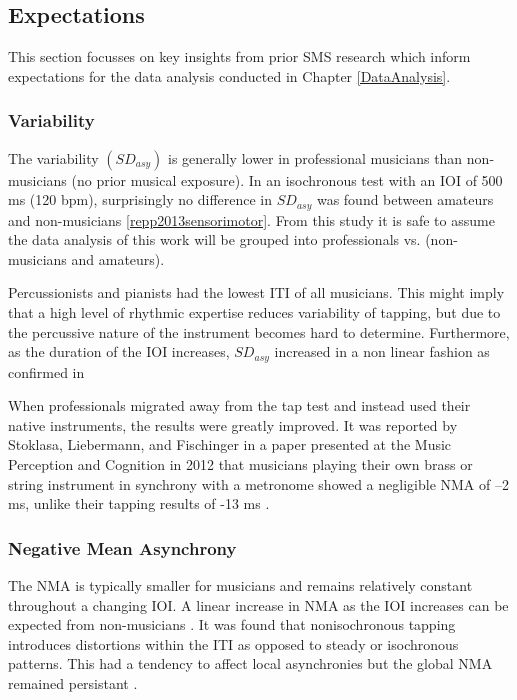 \subsection{Expectations} \label{SMSFindings}
This section focusses on key insights from prior SMS research which inform expectations for the data analysis conducted in Chapter \ref{DataAnalysis}.

\subsubsection{Variability}
The variability $(SD_{asy})$ is generally lower in professional musicians than non-musicians (no prior musical exposure). In an isochronous test with an IOI of 500 ms (120 bpm), surprisingly no difference in $SD_{asy}$ was found between amateurs and non-musicians \ref{repp2013sensorimotor}. From this study it is safe to assume the data analysis of this work will be grouped into professionals vs. (non-musicians and amateurs).

Percussionists and pianists had the lowest ITI of all musicians. This might imply that a high level of rhythmic expertise reduces variability of tapping, but due to the percussive nature of the instrument becomes hard to determine. Furthermore, as the duration of the IOI increases, $SD_{asy}$ increased in a non linear fashion as confirmed in

When professionals migrated away from the tap test and instead used their native instruments, the results were greatly improved. It was reported by Stoklasa, Liebermann, and Fischinger in a paper presented at the Music Perception and Cognition in 2012 that musicians playing their own brass or string instrument in synchrony with a metronome showed a negligible NMA of –2  ms, unlike their tapping results of -13 ms \cite{repp2013sensorimotor}.

\subsubsection{Negative Mean Asynchrony}
The NMA is typically smaller for musicians and remains relatively constant throughout a changing IOI. A linear increase in NMA as the IOI increases can be expected from non-musicians \cite{repp2013sensorimotor}. It was found that nonisochronous tapping introduces distortions within the ITI as opposed to steady or isochronous patterns. This had a tendency to affect local asynchronies but the global NMA remained persistant \cite{polak2016both}.
 
